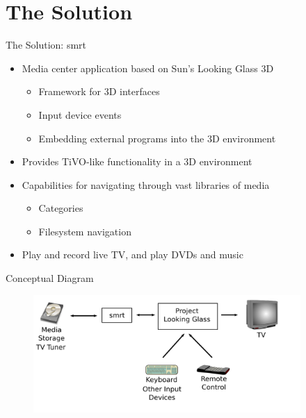 \documentclass[style=smrt,mode=present,paper=screen]{powerdot}
\begin{document}

\section[slide=false]{The Solution}
\begin{slide}[toc=,bm=]{The Solution: smrt}
\begin{itemize}
\item Media center application based on Sun's Looking Glass 3D
\begin{itemize}
	\item Framework for 3D interfaces
	\item Input device events
	\item Embedding external programs into the 3D environment
\end{itemize}
\item Provides TiVO-like functionality in a 3D environment
\item Capabilities for navigating through vast libraries of media
\begin{itemize}
	\item Categories
	\item Filesystem navigation
\end{itemize}
\item Play and record live TV, and play DVDs and music
\end{itemize}
\end{slide}

\begin{slide}{Conceptual Diagram}
\begin{figure}[htb]
	\includegraphics[width=4in]{../lib/figures/conceptual_overview}
\end{figure}
\end{slide}
\end{document}
